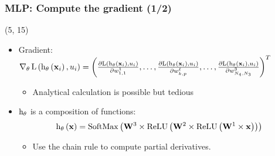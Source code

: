
\begin{frame}[label=Backpropagation]
  \frametitle{\acl{MLP}: Compute the gradient (1/2)}

  \begin{textblock}{90}(5, 15)
    \begin{itemize}
    \item Gradient:
      $
      \operatorname{\nabla}_{\mathbf{\theta}} \mathrm{L} \left ( {\mathrm{h}_{\mathbf{\theta}} \left ( {\mathbf{x}_i} \right ), u_i} \right ) =
      \left( \frac{\partial \mathrm{L} \left ( {\mathrm{h}_{\mathbf{\theta}} \left ( {\mathbf{x}_i} \right ),
            u_i} \right )}{\partial w_{1,1}^1}, \ldots, \frac{\partial \mathrm{L} \left ( {\mathrm{h}_{\mathbf{\theta}} \left ( {\mathbf{x}_i} \right ), u_i} \right )}{\partial w_{k,p}^{\ell}},\ldots,\frac{\partial \mathrm{L} \left ( {\mathrm{h}_{\mathbf{\theta}} \left ( {\mathbf{x}_i} \right ), u_i} \right )}{\partial w_{N_{4},N_{3}}^{3}} \right)^T
      $

      \begin{itemize}
      \item Analytical calculation is possible but tedious
      \end{itemize}
    \item $\mathrm{h}_{\mathbf{\theta}}$ is a composition of functions:
      \[
        \apply{\hyp_{\params}}{\example} = \apply{\softMaxFunc}{%
          \weightMatrix^3 \times
          \apply{\ReLUFunc}{%
            \weightMatrix^2 \times
            \apply{\ReLUFunc}{%
              \weightMatrix^1 \times \example
            }
          }
        }
      \]
      \begin{itemize}
      \item Use the chain rule to compute partial derivatives.
      \end{itemize}
    \end{itemize}
  \end{textblock}
\end{frame}

